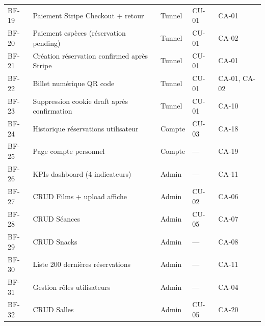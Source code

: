 \documentclass[12pt,a4paper,openany]{report}
\begin{document}
\begin{longtable}{p{1.1cm}p{5cm}p{1.3cm}p{1.2cm}l}
  BF-19 & Paiement Stripe Checkout + retour               & Tunnel  & CU-01 & CA-01 \\
  BF-20 & Paiement espèces (réservation pending)          & Tunnel  & CU-01 & CA-02 \\
  BF-21 & Création réservation confirmed après Stripe     & Tunnel  & CU-01 & CA-01 \\
  BF-22 & Billet numérique QR code                        & Tunnel  & CU-01 & CA-01, CA-02 \\
  BF-23 & Suppression cookie draft après confirmation     & Tunnel  & CU-01 & CA-10 \\
  BF-24 & Historique réservations utilisateur             & Compte  & CU-03 & CA-18 \\
  BF-25 & Page compte personnel                           & Compte  & ---   & CA-19 \\
  BF-26 & KPIs dashboard (4 indicateurs)                  & Admin   & ---   & CA-11 \\
  BF-27 & CRUD Films + upload affiche                     & Admin   & CU-02 & CA-06 \\
  BF-28 & CRUD Séances                                    & Admin   & CU-05 & CA-07 \\
  BF-29 & CRUD Snacks                                     & Admin   & ---   & CA-08 \\
  BF-30 & Liste 200 dernières réservations                & Admin   & ---   & CA-11 \\
  BF-31 & Gestion rôles utilisateurs                      & Admin   & ---   & CA-04 \\
  BF-32 & CRUD Salles                                     & Admin   & CU-05 & CA-20 \\
\end{longtable}

\bigskip
\end{document}
